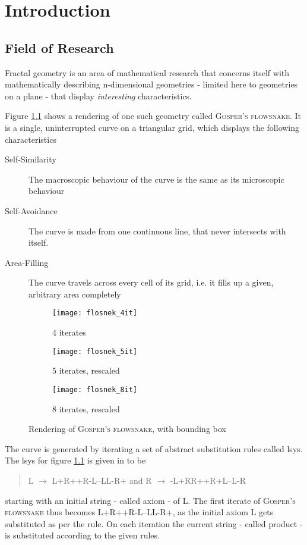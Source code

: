 \chapter{Introduction}
\label{cha:Intro}

\section{Field of Research}

Fractal geometry is an area of mathematical research that concerns itself with mathematically describing n-dimensional geometries - limited here to geometries on a plane - that display \textit{interesting} characteristics. 

Figure \ref{fig:flosnek} shows a rendering of one such geometry called \textsc{Gosper's flowsnake}.
It is a single, uninterrupted curve on a triangular grid, which displays the following characteristics

\begin{description}
	\item [Self-Similarity] The macroscopic behaviour of the curve is the same as its microscopic behaviour
	\item [Self-Avoidance] The curve is made from one continuous line, that never intersects with itself.
	\item [Area-Filling] The curve travels across every cell of its grid, i.e. it fills up a given, arbitrary area completely
\end{description}

\begin{figure}[h]
\centering
\begin{subfigure}{.33\textwidth}
  \centering
  \texttt{[image: flosnek\_4it]}
  \caption{4 iterates}
\end{subfigure}%
\begin{subfigure}{.33\textwidth}
  \centering
  \texttt{[image: flosnek\_5it]}
  \caption{5 iterates, rescaled}
\end{subfigure}%
\begin{subfigure}{.33\textwidth}
  \centering
  \texttt{[image: flosnek\_8it]}
  \caption{8 iterates, rescaled}
\end{subfigure}
\caption{Rendering of \textsc{Gosper's flowsnake}, with \gls{bounding box}}
	\label{fig:flosnek}
\end{figure}

The curve is generated by iterating a set of abstract substitution rules called \gls{lsys}.
The \gls{lsys} for figure \ref{fig:flosnek} is given in \citet{Arndt2016} to be 
\begin{quote}
	\centering
	L $\rightarrow$ L+R++R-L--LL-R+ \quad and \quad R $\rightarrow$ -L+RR++R+L--L-R
\end{quote}
starting with an initial string -  called \gls{axiom} - of L. The first iterate of \textsc{Gosper's flowsnake} thus becomes L+R++R-L--LL-R+, as the initial \gls{axiom} L gets substituted as per the rule. 
On each iteration the current string - called product - is substituted according to the given rules.

